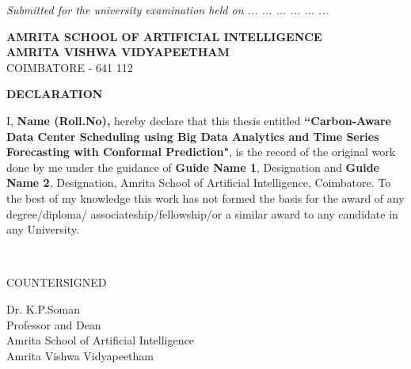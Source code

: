 \documentclass[12pt]{report}
\begin{document}
	\textit{{Submitted for the university examination held on ... ... ... ... ... ... \\}}
	\vspace*{.65cm}
	
	\newpage
	\baselineskip 1cm
	\thispagestyle{empty}
	
	
	\begin{center}
		\large {\textbf{AMRITA SCHOOL OF ARTIFICIAL INTELLIGENCE}}\\
		\vspace*{.2cm}
		\Large{ \textbf{ AMRITA VISHWA VIDYAPEETHAM}}\\
		\vspace*{.2cm}
		\small{ COIMBATORE} - 641 112\\
		
		
		
		\vspace*{.6cm}
		
		\large {\textbf{DECLARATION}}
		
		\vspace*{.1cm}
		
	\end{center}
	
	I, \textbf{Name (Roll.No),} hereby declare that this thesis entitled {\sc \textbf{``Carbon-Aware Data Center Scheduling using Big Data Analytics and Time Series Forecasting with Conformal Prediction"}}, is the record of the original work done by me under the guidance of \textbf{Guide Name 1}, Designation and  \textbf{Guide Name 2}, Designation, Amrita School of Artificial Intelligence, Coimbatore. To the best of my knowledge this work has not formed the basis for the award of any degree/diploma/ associateship/fellowship/or a similar award to any candidate in any University.\\
	
	\vspace*{.2cm}
	
	 \\
	
	\vspace*{.2cm}
	
	\begin{center}
		\large {COUNTERSIGNED}\\
		
		\vspace*{1.7cm}
		
		\small {Dr. K.P.Soman\\
			\vspace*{.1cm}
			Professor and Dean\\
			\vspace*{.1cm}
			Amrita School of Artificial Intelligence\\
            \vspace*{.1cm}
			Amrita Vishwa Vidyapeetham}
		
	\end{center}
	
\end{document}
